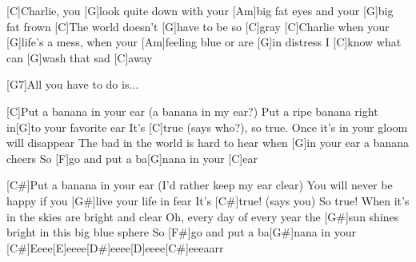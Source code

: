 


\begin{guitar}
	[C]Charlie, you [G]look quite down with your [Am]big fat eyes and your [G]big fat frown
	[C]The world doesn't [G]have to be so [C]gray
	[C]Charlie when your [G]life's a mess, when your [Am]feeling blue or are [G]in distress
	I [C]know what can [G]wash that sad [C]away
	
	[G7]All you have to do is...
	
	\begin{highlightbar}
		[C]Put a banana in your ear (a banana in my ear?)
		Put a ripe banana right in[G]to your favorite ear
		It's [C]true (says who?), so true. Once it's in your gloom will disappear
		The bad in the world is hard to hear when [G]in your ear a banana cheers
		So [F]go and put a ba[G]nana in your [C]ear
	\end{highlightbar}
	
	\begin{highlightbar}
		\songsection{Chorus 2}
		[C#]Put a banana in your ear (I'd rather keep my ear clear)
		You will never be happy if you [G#]live your life in fear
		It's [C#]true! (says you) So true! When it's in the skies are bright and clear
		Oh, every day of every year the [G#]sun shines bright in this big blue sphere
		So [F#]go and put a ba[G#]nana in your
		[C#]Eeee[E]eeee[D#]eeee[D]eeee[C#]eeeaarr
	\end{highlightbar}
\end{guitar}